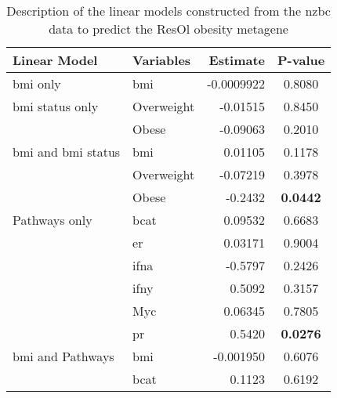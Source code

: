 	\begin{table}[htpb]
		\centering
		\caption{Description of the linear models constructed from the \gls{nzbc} data to predict the ResOl obesity metagene}
		\label{tab:lm_sig_var_resol}
		\begin{threeparttable}
			\begin{tabular}{llrc}
				Linear Model & Variables & Estimate & P-value\\
				\hline
				\hline
				\rule{0pt}{2.25ex}\gls{bmi} only                           & \gls{bmi}  & -0.0009922 & 0.8080 \\
				\hline
				\rule{0pt}{2.25ex}\gls{bmi} status only                    & Overweight & -0.01515   & 0.8450 \\
                                                                           & Obese      & -0.09063   & 0.2010 \\
				\hline
				\rule{0pt}{2.25ex}\gls{bmi} and \gls{bmi} status           & \gls{bmi}  & 0.01105    & 0.1178 \\
                                                                           & Overweight & -0.07219   & 0.3978 \\
                                                                           & Obese      & -0.2432    & \bfseries 0.0442  \\
				\hline
				\rule{0pt}{2.25ex}Pathways only                            & \gls{bcat} & 0.09532    & 0.6683 \\
                                                                           & \gls{er}   & 0.03171    & 0.9004 \\
                                                                           & \gls{ifna} & -0.5797    & 0.2426 \\
                                                                           & \gls{ifny} & 0.5092     & 0.3157 \\
                                                                           & Myc        & 0.06345    & 0.7805 \\
                                                                           & \gls{pr}   & 0.5420     & \bfseries 0.0276  \\
				\hline
				\rule{0pt}{2.25ex}\gls{bmi} and Pathways                   & \gls{bmi}  & -0.001950  & 0.6076 \\
                                                                           & \gls{bcat} & 0.1123     & 0.6192 \\

\end{tabular}
\end{threeparttable}
\end{table}
